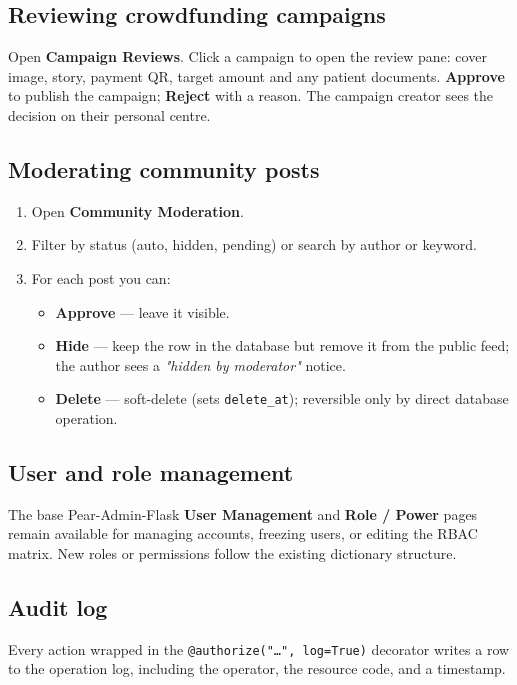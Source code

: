\subsection{Reviewing crowdfunding campaigns}
Open \textbf{Campaign Reviews}. Click a campaign to open the review
pane: cover image, story, payment QR, target amount and any patient
documents. \textbf{Approve} to publish the campaign;
\textbf{Reject} with a reason. The campaign creator sees the decision on
their personal centre.

\subsection{Moderating community posts}
\begin{enumerate}
  \item Open \textbf{Community Moderation}.
  \item Filter by status (auto, hidden, pending) or search by author or
        keyword.
  \item For each post you can:
        \begin{itemize}
          \item \textbf{Approve} — leave it visible.
          \item \textbf{Hide} — keep the row in the database but remove
                it from the public feed; the author sees a \emph{"hidden
                by moderator"} notice.
          \item \textbf{Delete} — soft-delete (sets \texttt{delete\_at});
                reversible only by direct database operation.
        \end{itemize}
\end{enumerate}

\subsection{User and role management}
The base Pear-Admin-Flask \textbf{User Management} and \textbf{Role /
Power} pages remain available for managing accounts, freezing users, or
editing the RBAC matrix. New roles or permissions follow the existing
dictionary structure.

\subsection{Audit log}
Every action wrapped in the \texttt{@authorize("…", log=True)}
decorator writes a row to the operation log, including the operator,
the resource code, and a timestamp.

